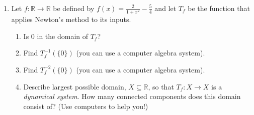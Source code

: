 \documentclass[letter]{article}
\newcommand{\R}{\mathbb{R}}
\begin{document}
\begin{enumerate}
		\item Let $f:\R\to\R$ be defined by $f(x)=\frac{2}{1+x^2}-\frac{5}{4}$ and let $T_f$ be the function that applies Newton's method
			to its inputs.
			\begin{enumerate}
				\item Is $0$ in the domain of $T_f$?
				\item Find $T_f^{-1}(\{0\})$ (you can use a computer algebra system).
				\item Find $T_f^{-2}(\{0\})$ (you can use a computer algebra system).
				\item Describe largest possible domain, $X\subseteq \R$, so that $T_f:X\to X$ is a \emph{dynamical
					system}. How many connected components does this domain consist of? (Use computers to help you!)
			\end{enumerate}


\end{enumerate}
\end{document}
